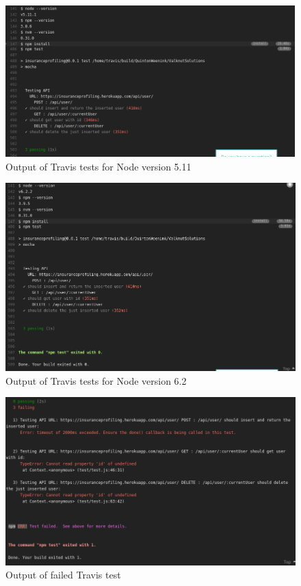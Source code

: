 \documentclass{article}
\begin{document}
\begin{figure}[h]
  \centering
      \includegraphics[width=\textwidth]{images/5_11.png}
  \caption{Output of Travis tests for Node version 5.11}
  \label{fig:5_11}
\end{figure}

\begin{figure}[h]
  \centering
      \includegraphics[width=\textwidth]{images/6_2.png}
  \caption{Output of Travis tests for Node version 6.2}
  \label{fig:6_2}
\end{figure}

\begin{figure}[h]
  \centering
      \includegraphics[width=\textwidth]{images/failed.png}
  \caption{Output of failed Travis test}
  \label{fig:failed}
\end{figure}
\end{document}
